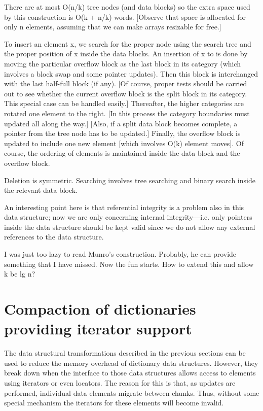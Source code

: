 \documentclass{DIKU-article}
\newcommand{\seclabel}[1]{\label{sec:#1}}
\begin{document}
There are at most O(n/k) tree nodes (and data blocks) so the extra space used by this construction is O(k + n/k) words. [Observe that space is allocated for only n elements, assuming that we can make arrays resizable for free.]

To insert an element x, we search for the proper node using the search tree and the proper position of x inside the data blocks. An insertion of x to is done by moving the particular overflow block as the last block in its category (which involves a block swap and some pointer updates). Then this block is interchanged with the last half-full block (if any). [Of course, proper tests should be carried out to see whether the  current overflow block is  the split block in its category. This special case can be handled easily.] Thereafter, the higher categories are rotated one element to the right.  [In this process the category boundaries must updated all along the way.] [Also, if a split data block becomes complete, a pointer from the tree node has to be updated.] Finally, the overflow block is updated to include one new element [which involves O(k) element moves]. Of course, the ordering of elements is maintained inside the data block and the overflow block.

Deletion is symmetric. Searching involves tree searching and binary search inside the relevant data block.

An interesting point here is that referential integrity is a problem also in this data structure; now we are only concerning internal integrity---i.e. only pointers inside the data structure should be kept valid since we do not allow any external references to the data structure.

I was just too lazy to read Munro's construction. Probably, he can provide something that I have missed. Now the fun starts. How to extend this and allow k be lg n?



\section{Compaction of dictionaries providing iterator support}
\seclabel{iterator-dictionaries}

The data structural transformations described in the previous sections
can be used to reduce the memory overhead of dictionary data
structures.  However, they break down when the interface to those data
structures allows access to elements using iterators or even locators.
The reason for this is that, as updates are performed, individual data
elements migrate between chunks.  Thus, without some special mechanism
the iterators for these elements will become invalid.
\end{document}
